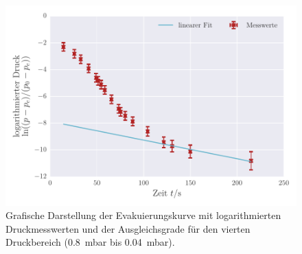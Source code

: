\begin{figure}[!h]
 \centering
 \includegraphics[scale=0.8]{../Grafiken/Evakuierungskurve_Drehschieber_log_3.pdf}
 \caption{Grafische Darstellung der Evakuierungskurve mit logarithmierten Druckmesswerten und der Ausgleichsgrade für den vierten Druckbereich (\SI{0.8}{\milli\bar} bis \SI{0.04}{\milli\bar}). \label{fig:evakuierungskurve_drehschieber_log_3}}
 \end{figure} 
 
 